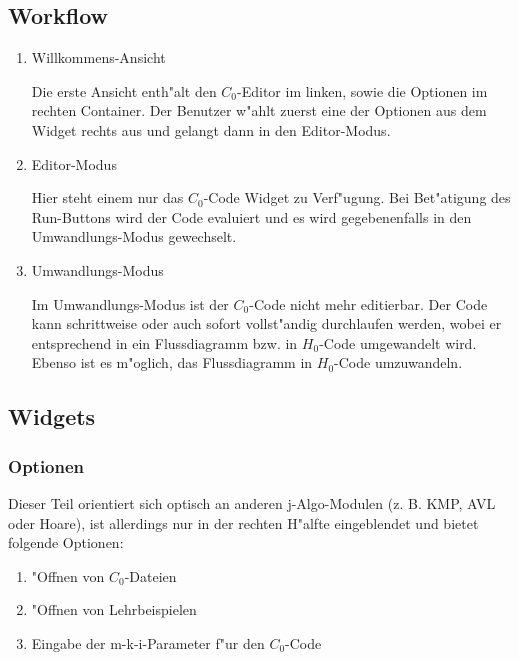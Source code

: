 \subsection{Workflow}
	\begin{enumerate}
		\item Willkommens-Ansicht
		\begin{description}
			Die erste Ansicht enth"alt den $C_0$-Editor im linken, sowie die Optionen im rechten Container.
			Der Benutzer w"ahlt  zuerst eine der Optionen aus dem Widget rechts aus und gelangt dann in den Editor-Modus.
		\end{description}

		\item Editor-Modus
		\begin{description}
			Hier steht einem nur das $C_0$-Code Widget zu Verf"ugung.
			Bei Bet"atigung des Run-Buttons wird der Code evaluiert und es wird gegebenenfalls in den Umwandlungs-Modus gewechselt.
		\end{description}

		\item Umwandlungs-Modus
		\begin{description}
			Im Umwandlungs-Modus ist der $C_0$-Code nicht mehr editierbar.
			Der Code kann schrittweise oder auch sofort vollst"andig durchlaufen werden, wobei er entsprechend
			in ein Flussdiagramm bzw. in $H_0$-Code umgewandelt wird.
			Ebenso ist es m"oglich, das Flussdiagramm in $H_0$-Code umzuwandeln.
		\end{description}
	\end{enumerate}
	


\subsection{Widgets}
	\subsubsection{Optionen}
		Dieser Teil orientiert sich optisch an anderen j-Algo-Modulen (z. B. KMP, AVL oder Hoare), 
		ist allerdings nur in der rechten H"alfte eingeblendet und bietet folgende Optionen:
		\begin{enumerate}
			\item "Offnen von $C_0$-Dateien
			\item "Offnen von Lehrbeispielen
			\item Eingabe der m-k-i-Parameter f"ur den $C_0$-Code
		\end{enumerate}

